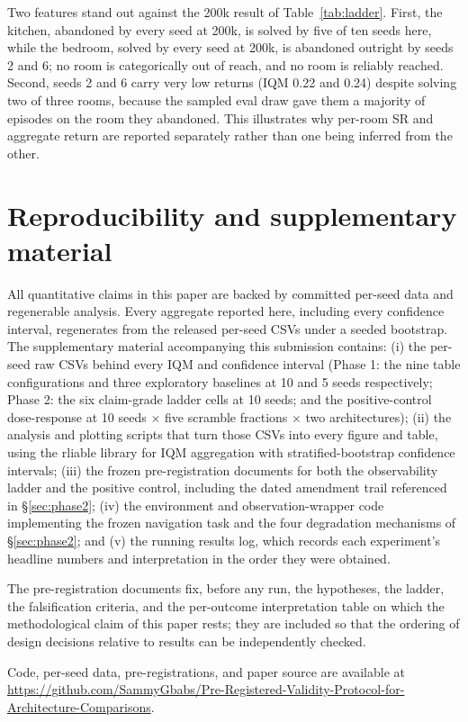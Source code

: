 \documentclass[10pt]{article}
\begin{document}
Two features stand out against the 200k result of Table~\ref{tab:ladder}. First, the kitchen,
abandoned by every seed at 200k, is solved by five of ten seeds here, while the bedroom,
solved by every seed at 200k, is abandoned outright by seeds 2 and 6; no room is
categorically out of reach, and no room is reliably reached. Second, seeds 2 and 6 carry very
low returns (IQM 0.22 and 0.24) despite solving two of three rooms, because the sampled eval
draw gave them a majority of episodes on the room they abandoned. This illustrates why
per-room SR and aggregate return are reported separately rather than one being inferred from
the other.

\section{Reproducibility and supplementary material}
\label{app:repro}

All quantitative claims in this paper are backed by committed per-seed data and regenerable
analysis. Every aggregate reported here, including every confidence interval, regenerates
from the released per-seed CSVs under a seeded bootstrap. The supplementary material
accompanying this submission contains: (i) the per-seed raw CSVs behind every IQM and
confidence interval (Phase 1: the nine table configurations and three exploratory baselines
at 10 and 5 seeds respectively; Phase 2: the six claim-grade ladder cells at 10 seeds; and
the positive-control dose-response at 10 seeds $\times$ five scramble fractions $\times$ two
architectures); (ii) the analysis and plotting scripts that turn those CSVs into every figure
and table, using the rliable library for IQM aggregation with stratified-bootstrap confidence
intervals; (iii) the frozen pre-registration documents for both the observability ladder and
the positive control, including the dated amendment trail referenced in \S\ref{sec:phase2};
(iv) the environment and observation-wrapper code implementing the frozen navigation task and
the four degradation mechanisms of \S\ref{sec:phase2}; and (v) the running results log, which
records each experiment's headline numbers and interpretation in the order they were
obtained.

The pre-registration documents fix, before any run, the hypotheses, the ladder, the
falsification criteria, and the per-outcome interpretation table on which the methodological
claim of this paper rests; they are included so that the ordering of design decisions relative
to results can be independently checked.

\ifdefined\ispreprint
Code, per-seed data, pre-registrations, and paper source are available at
\url{https://github.com/SammyGbabs/Pre-Registered-Validity-Protocol-for-Architecture-Comparisons}.
\fi
\end{document}
